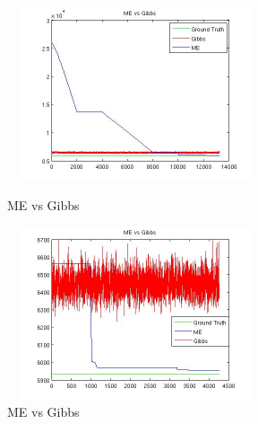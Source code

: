 \documentclass{article}
\begin{document}
\begin{spacing}{1.1}
\begin{figure}[h] 
  \begin{minipage}[b]{0.5\textwidth} 
    \centering 
    \includegraphics[width=3in,height=2in]{hdp_com.jpg} 
    \caption{ME vs Gibbs} 
    \label{fig:by:table} 
  \end{minipage}%
  \begin{minipage}[b]{0.5\textwidth} 
    \centering 
    \includegraphics[width=3in,height=2in]{hdp_com2.jpg} 
    \caption{ME vs Gibbs}
    \label{fig:by:table}  
   \end{minipage}%
\end{figure}


\end{spacing}
\end{document}
